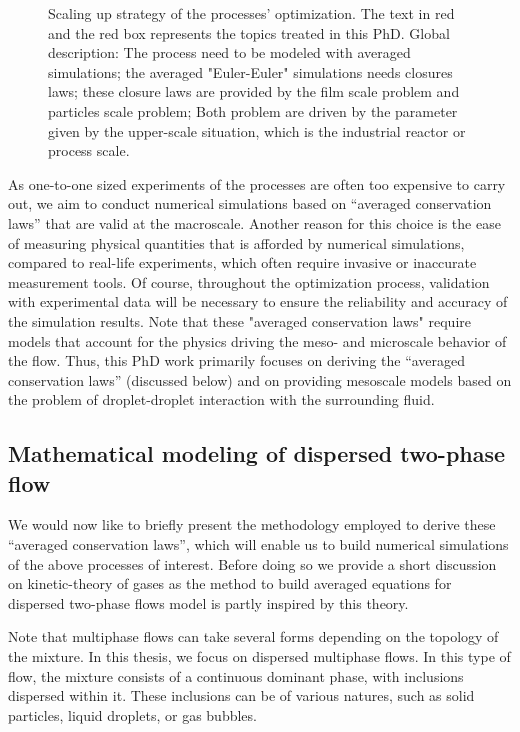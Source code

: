 \begin{figure}[h!]
\begin{tikzpicture}[font=\footnotesize,very thick, scale = 0.9]
    \end{tikzpicture}
    \caption{Scaling up strategy of the processes' optimization.  The text in red and the red box represents the topics treated in this PhD. 
    Global description: 
    The process need to be modeled with averaged simulations; the averaged "Euler-Euler" simulations needs closures laws; these closure laws are provided by the film scale problem and particles scale problem; Both problem are driven by the parameter given by the upper-scale situation, which is the industrial reactor or process scale. }
    \label{fig:scaling_up}
\end{figure}

As one-to-one sized experiments of the processes are often too expensive to carry out, we aim to conduct numerical simulations based on ``averaged conservation laws'' that are valid at the macroscale. 
Another reason for this choice is the ease of measuring physical quantities that is afforded by numerical simulations, compared to real-life experiments, which often require invasive or inaccurate measurement tools.
Of course, throughout the optimization process, validation with experimental data will be necessary to ensure the reliability and accuracy of the simulation results. 
Note that these "averaged conservation laws" require models that account for the physics driving the meso- and microscale behavior of the flow. 
Thus, this PhD work primarily focuses on deriving the ``averaged conservation laws'' (discussed below) and on providing mesoscale models based on the problem of droplet-droplet interaction with the surrounding fluid.

\subsection{Mathematical modeling of dispersed two-phase flow}

We would now like to briefly present the methodology employed to derive these ``averaged conservation laws'', which will enable us to build numerical simulations of the above processes of interest.
Before doing so we provide a short discussion on kinetic-theory of gases as the method to build averaged equations for dispersed two-phase flows model is partly inspired by this theory. 

Note that multiphase flows can take several forms depending on the topology of the mixture. In this thesis, we focus on dispersed multiphase flows.
In this type of flow, the mixture consists of a continuous dominant phase, with inclusions dispersed within it. These inclusions can be of various natures, such as solid particles, liquid droplets, or gas bubbles.

